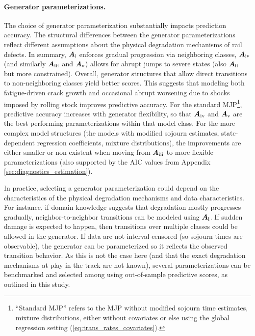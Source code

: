 \documentclass{article}
\newcommand{\RN}[1]{\textup{\uppercase\expandafter{\romannumeral#1}}}
\begin{document}
\paragraph{Generator parameterizations.}
The choice of generator parameterization substantially impacts prediction accuracy. 
The structural differences between the generator parameterizations reflect different assumptions about the physical degradation mechanisms of rail defects.
In summary, $\bm{A}_{\RN{1}}$ enforces gradual progression via neighboring classes, $\bm{A}_{\RN{4}}$ (and similarly $\bm{A}_{\RN{3}}$ and $\bm{A}_{\RN{5}}$) allows for abrupt jumps to severe states (also $\bm{A}_{\RN{2}}$ but more constrained). 
Overall, generator structures that allow direct transitions to non-neighboring classes yield better scores. This suggests that modeling both fatigue-driven crack growth and occasional abrupt worsening due to shocks imposed by rolling stock improves predictive accuracy.
For the standard MJP\footnote{``Standard MJP'' refers to the MJP without modified sojourn time estimates, mixture distributions, either without covariates or else using the global regression setting (\cref{eq:trans_rates_covariates}).}, predictive accuracy increases with generator flexibility, so that $\bm{A}_{\RN{4}}$ and $\bm{A}_{\RN{5}}$ are the best performing parameterizations within that model class. For the more complex model structures (the models with modified sojourn estimates, state-dependent regression coefficients, mixture distributions), the improvements are either smaller or non-existent when moving from $\bm{A}_{\RN{3}}$ to more flexible parameterizations (also supported by the AIC values from Appendix \ref{sec:diagnostics_estimation}).

In practice, selecting a generator parameterization could depend on the characteristics of the physical degradation mechanisms and data characteristics. For instance, if domain knowledge suggests that degradation mostly progresses gradually, neighbor-to-neighbor transitions can be modeled using $\bm{A}_{\RN{1}}$. If sudden damage is expected to happen, then transitions over multiple classes could be allowed in the generator.
If data are not interval-censored (so sojourn times are observable), the generator can be parameterized so it reflects the observed transition behavior. As this is not the case here (and that the exact degradation mechanisms at play in the track are not known), several parameterizations can be benchmarked and selected among using out-of-sample predictive scores, as outlined in this study.
\end{document}

